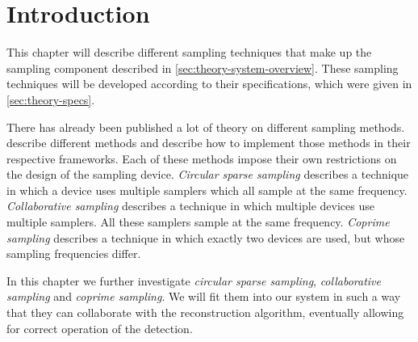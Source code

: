 \documentclass[a4paper, openany, oneside]{memoir}
\begin{document}
\section{Introduction}
This chapter will describe different sampling techniques that make up the sampling component described in \cref{sec:theory-system-overview}. These sampling techniques will be developed according to their specifications, which were given in \cref{sec:theory-specs}.

There has already been published a lot of theory on different sampling methods. \cite{ariananda2012compressive,ariananda2014cooperative,pal2011coprime} describe different methods and describe how to implement those methods in their respective frameworks. Each of these methods impose their own restrictions on the design of the sampling device. \textit{Circular sparse sampling} \cite{ariananda2012compressive} describes a technique in which a device uses multiple samplers which all sample at the same frequency. \textit{Collaborative sampling} \cite{ariananda2014cooperative} describes a technique in which multiple devices use multiple samplers. All these samplers sample at the same frequency. \textit{Coprime sampling} describes a technique in which exactly two devices are used, but whose sampling frequencies differ.

In this chapter we further investigate \textit{circular sparse sampling}, \textit{collaborative sampling} and \textit{coprime sampling}. We will fit them into our system in such a way that they can collaborate with the reconstruction algorithm, eventually allowing for correct operation of the detection. 


\end{document}
